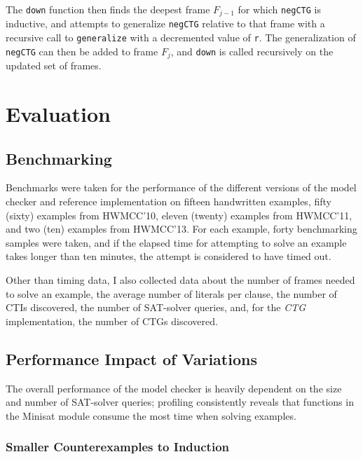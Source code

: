 \documentclass[12pt,a4paper,twoside,openright]{report}
\begin{document}
{The \verb,down, function then finds the deepest frame $F_{j - 1}$ for which \verb,negCTG, is inductive, and attempts to generalize
\verb,negCTG, relative to that frame with a recursive call to \verb,generalize, with a decremented value of \verb,r,.
The generalization of \verb,negCTG, can then be added to frame $F_j$,
and \verb,down, is called recursively on the updated set of frames.

\chapter{Evaluation}

\section{Benchmarking}
Benchmarks were taken for the performance of the different versions of the model checker and reference implementation
on fifteen handwritten examples, fifty (sixty) examples from HWMCC'10, eleven (twenty) examples from HWMCC'11, and
two (ten) examples from HWMCC'13. For each example, forty benchmarking samples were taken, and if the elapsed time for
attempting to solve an example takes longer than ten minutes, the attempt is considered to have timed out.

Other than timing data, I also collected data about the number of frames needed to solve an example,
the average number of literals per clause, the number of CTIs discovered, the number of SAT-solver queries, and,
for the \emph{CTG} implementation, the number of CTGs discovered.

\section{Performance Impact of Variations}

The overall performance of the model checker is heavily dependent on the size and number of SAT-solver queries;
profiling consistently reveals that functions in the Minisat module consume the most time when solving examples.

\subsection{Smaller Counterexamples to Induction}

}
\end{document}
